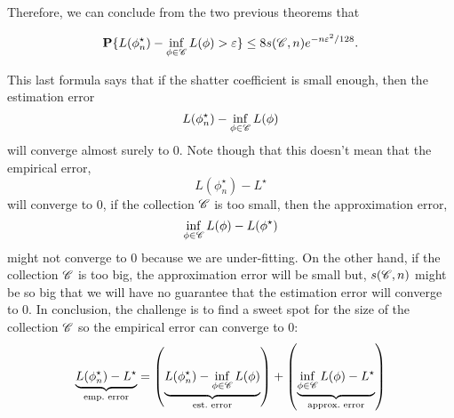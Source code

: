 Therefore, we can conclude from the two previous theorems that

\[ \mathbf{P}\{L(\phi_n^\star) - \inf_{\phi\in \mathscr{C}} L(\phi) > \varepsilon\} \leq  8 s(\mathscr{C},n) e^{-n\varepsilon^2/128}. \] 

This last formula says that if the shatter coefficient is small enough, then the estimation error
\[  L(\phi_n^\star) - \inf_{\phi\in\mathscr{C}} L(\phi) \] 
will converge almost surely to 0. Note though that this doesn't mean that the empirical error,
\[ L(\phi_n^\star)- L^\star \] 
will converge to 0, if the collection $\mathscr{C}$ is too small, then the approximation error,
\[ \inf_{\phi\in\mathscr{C}} L(\phi) - L(\phi^\star) \] 
might not converge to 0 because we are under-fitting. On the other hand, if the collection $\mathscr{C}$ is too big, the approximation error will be small but, $s(\mathscr{C}, n)$ might be so big that we will have no guarantee that the estimation error will converge to 0. In conclusion, the challenge is to find a sweet spot for the size of the collection $\mathscr{C}$ so the empirical error can converge to 0:
\[ \underbrace{L(\phi_n^\star)- L^\star}_{\text{emp.~error}} = \left(\underbrace{L(\phi_n^\star)- \inf_{\phi\in \mathscr{C}} L(\phi)}_{\text{est.~error}}\right) + \left(\underbrace{\inf_{\phi\in \mathscr{C}} L(\phi)- L^\star}_{\text{approx.~error}}\right) \] 

